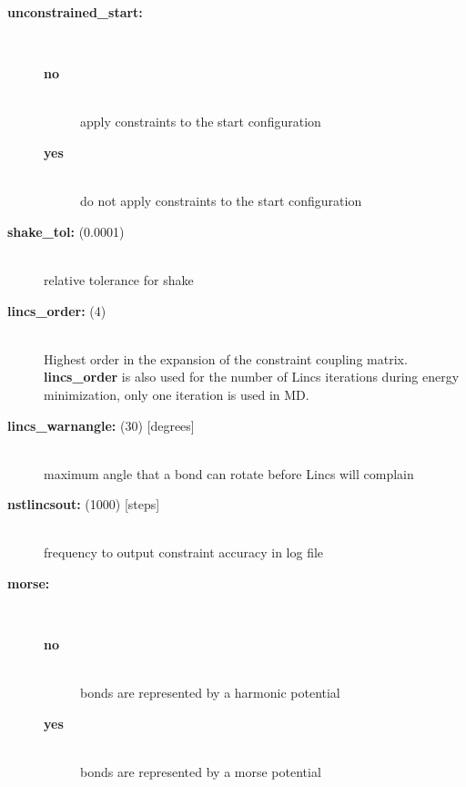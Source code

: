 \begin{description}
\item[{\bf unconstrained\_start:}]\mbox{}\\
\vspace{-2ex}\begin{description}
\item[{\bf no}]\mbox{}\\
apply constraints to the start configuration
\item[{\bf yes}]\mbox{}\\
do not apply constraints to the start configuration
\end{description}
\item[{\bf shake\_tol: }(0.0001)]\mbox{}\\
relative tolerance for shake
\item[{\bf lincs\_order: }(4)]\mbox{}\\
Highest order in the expansion of the constraint coupling matrix.
{\bf lincs\_order} is also used for the number of Lincs iterations
during energy minimization, only one iteration is used in MD.
\item[{\bf lincs\_warnangle: }(30) {[degrees]}]\mbox{}\\
maximum angle that a bond can rotate before Lincs will complain
\item[{\bf nstlincsout: }(1000) {[steps]}]\mbox{}\\
frequency to output constraint accuracy in log file
\item[{\bf morse:}]\mbox{}\\
\vspace{-2ex}\begin{description}
\item[{\bf no}]\mbox{}\\
bonds are represented by a harmonic potential
\item[{\bf yes}]\mbox{}\\
bonds are represented by a morse potential
\end{description}
\end{description}

